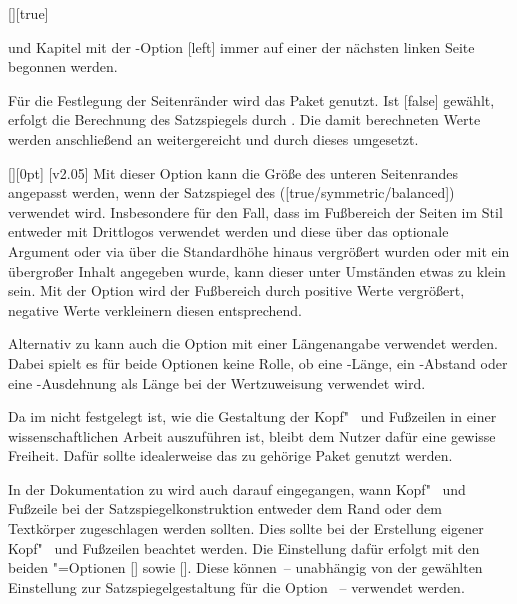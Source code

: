 \begin{Declaration*}{}
\begin{Declaration*}{}
\begin{Declaration*}{}
\begin{Declaration}[v2.03]{[\PSet]}[true]
\begin{values}
  und Kapitel mit der \KOMAScript-Option [left] immer auf einer 
  der nächsten linken Seite begonnen werden.
\end{values}
%
Für die Festlegung der Seitenränder wird das Paket  genutzt. 
Ist [false] gewählt, erfolgt die Berechnung des Satzspiegels 
durch . Die damit berechneten Werte werden anschließend an 
 weitergereicht und durch dieses umgesetzt.
\end{Declaration}

\begin{Declaration}[v2.03]{[]}[0pt]%
\printdeclarationlist%
%
[v2.05]
Mit dieser Option kann die Größe des unteren Seitenrandes angepasst werden, 
wenn der Satzspiegel des \CDs ([true/symmetric/balanced]) 
verwendet wird. Insbesondere für den Fall, dass im Fußbereich der Seiten im 
Stil  entweder mit  Drittlogos verwendet 
werden und diese über das optionale Argument oder via  
über die Standardhöhe hinaus vergrößert wurden oder mit  ein 
übergroßer Inhalt angegeben wurde, kann dieser unter Umständen etwas zu klein 
sein. Mit der Option  wird der Fußbereich durch 
positive Werte vergrößert, negative Werte verkleinern diesen entsprechend. 

Alternativ zu  kann auch die Option  
mit einer Längenangabe verwendet werden. Dabei spielt es für beide Optionen 
keine Rolle, ob eine -Länge, ein -Abstand oder eine 
-Ausdehnung als Länge bei der Wertzuweisung verwendet wird.
\end{Declaration}

%
%
%
Da im \CD nicht festgelegt ist, wie die Gestaltung der Kopf"~ und Fußzeilen in 
einer wissenschaftlichen Arbeit auszuführen ist, bleibt dem Nutzer dafür eine 
gewisse Freiheit. Dafür sollte idealerweise das zu \KOMAScript{} gehörige Paket 
 genutzt werden. 

In der Dokumentation zu  wird auch darauf eingegangen, wann 
Kopf"~ und Fußzeile bei der Satzspiegelkonstruktion entweder dem Rand oder dem 
Textkörper zugeschlagen werden sollten. Dies sollte bei der Erstellung eigener 
Kopf"~ und Fußzeilen beachtet werden. Die Einstellung dafür erfolgt mit den 
beiden \KOMAScript"=Optionen [\PBoolean] sowie 
[\PBoolean]. Diese können~-- unabhängig von der gewählten 
Einstellung zur Satzspiegelgestaltung für die Option ~-- 
verwendet werden.


\end{Declaration*}
\end{Declaration*}
\end{Declaration*}
